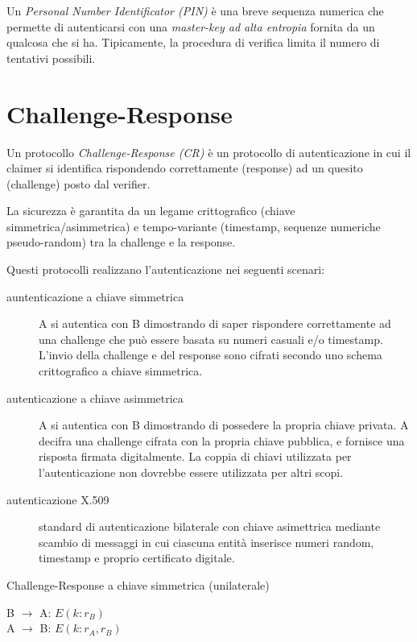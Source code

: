 Un \textit{Personal Number Identificator (PIN)} è una breve sequenza numerica che permette di autenticarsi con una \textit{master-key ad alta entropia} fornita da un qualcosa che si ha. Tipicamente, la procedura di verifica limita il numero di tentativi possibili.


\section{Challenge-Response}
Un protocollo \textit{Challenge-Response (CR)} è un protocollo di autenticazione in cui il claimer si identifica rispondendo correttamente (response) ad un quesito (challenge) posto dal verifier.

La sicurezza è garantita da un legame crittografico (chiave simmetrica/asimmetrica) e tempo-variante (timestamp, sequenze numeriche pseudo-random) tra la challenge e la response.

Questi protocolli realizzano l'autenticazione nei seguenti scenari:

\begin{description}
  \item[auntenticazione a chiave simmetrica] A si autentica con B dimostrando di saper rispondere correttamente ad una challenge che può essere basata su numeri casuali e/o timestamp. L'invio della challenge e del response sono cifrati secondo uno schema crittografico a chiave simmetrica.

  \item[autenticazione a chiave asimmetrica] A si autentica con B dimostrando di possedere la propria chiave privata. A decifra una challenge cifrata con la propria chiave pubblica, e fornisce una risposta firmata digitalmente.
  La coppia di chiavi utilizzata per l'autenticazione non dovrebbe essere utilizzata per altri scopi.

  \item[autenticazione X.509] standard di autenticazione bilaterale con chiave asimettrica mediante scambio di messaggi in cui ciascuna entità inserisce numeri random, timestamp e proprio certificato digitale.
\end{description}

\bigskip
\begin{algorithm}[H]
  \caption{Challenge-Response a chiave simmetrica (unilaterale)}
  \label{alg:authentication-challenge-response-unilateral-symmetric}
  \SetAlgoNoLine
  B $\rightarrow$ A: $E(k:r_{B})$\\
  A $\rightarrow$ B: $E(k:r_{A},r_{B})$\\
\end{algorithm}


